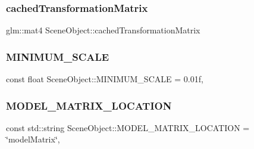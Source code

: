 \subsubsection{\texorpdfstring{cached\+Transformation\+Matrix}{cachedTransformationMatrix}}
{\footnotesize\ttfamily glm\+::mat4 Scene\+Object\+::cached\+Transformation\+Matrix\hspace{0.3cm}{\ttfamily [protected]}}

\hypertarget{class_scene_object_a903eef54277645571794fd87dc8e9fbb}{}\label{class_scene_object_a903eef54277645571794fd87dc8e9fbb}
\subsubsection{\texorpdfstring{M\+I\+N\+I\+M\+U\+M\+\_\+\+S\+C\+A\+LE}{MINIMUM\_SCALE}}
{\footnotesize\ttfamily const float Scene\+Object\+::\+M\+I\+N\+I\+M\+U\+M\+\_\+\+S\+C\+A\+LE = 0.\+01f\hspace{0.3cm}{\ttfamily [static]}, {\ttfamily [protected]}}

\hypertarget{class_scene_object_a62d236f4f5c52b66bd02d13d09b6ce5e}{}\label{class_scene_object_a62d236f4f5c52b66bd02d13d09b6ce5e}
\subsubsection{\texorpdfstring{M\+O\+D\+E\+L\+\_\+\+M\+A\+T\+R\+I\+X\+\_\+\+L\+O\+C\+A\+T\+I\+ON}{MODEL\_MATRIX\_LOCATION}}
{\footnotesize\ttfamily const std\+::string Scene\+Object\+::\+M\+O\+D\+E\+L\+\_\+\+M\+A\+T\+R\+I\+X\+\_\+\+L\+O\+C\+A\+T\+I\+ON = \char`\"{}model\+Matrix\char`\"{}\hspace{0.3cm}{\ttfamily [static]}, {\ttfamily [protected]}}

\hypertarget{class_scene_object_ab4aa9bed778001970c38ea11ef34b285}{}\label{class_scene_object_ab4aa9bed778001970c38ea11ef34b285}

